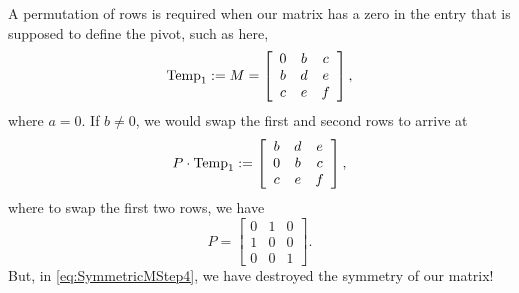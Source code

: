 A permutation of rows is required when our matrix has a zero in the entry that is supposed to define the pivot, such as here,
\begin{equation}
    \label{eq:SymmetricMStep3}
  {\rm Temp}_{1}:= M= \left[\begin{array}{ccc} 
   0 & b & c\\
   b & d & e\\
   c & e & f
   \end{array}\right],
\end{equation}
where $a=0$. If $b\neq 0$, we would swap the first and second rows to arrive at
\begin{equation}
    \label{eq:SymmetricMStep4}
  P \cdot {\rm Temp}_{1}:=  \left[\begin{array}{ccc}
    b & d & e\\
   0 & b & c\\
   c & e & f
   \end{array}\right],
\end{equation}
where to swap the first two rows, we have 
\begin{equation}
    \label{eq:SymmetricMStep5}
P=\left[\begin{array}{ccc}
    0 & 1 & 0\\
   1 & 0 & 0\\
   0 & 0 & 1
   \end{array}\right]. 
  \end{equation}
 But, in \eqref{eq:SymmetricMStep4}, we have destroyed the symmetry of our matrix!
  
